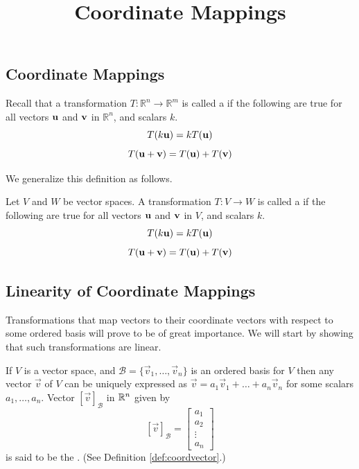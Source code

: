 \documentclass{ximera}
\title{Coordinate Mappings} \license{CC BY-NC-SA 4.0}
\begin{document}
\begin{abstract}
\end{abstract}
\maketitle

\begin{onlineOnly}
\section*{Coordinate Mappings}
\end{onlineOnly}

Recall that a transformation $T:\mathbb{R}^n\rightarrow \mathbb{R}^m$ is called a  if the following are true for all vectors ${\bf u}$ and ${\bf v}$ in $\mathbb{R}^n$, and scalars $k$.
\begin{equation*}
T(k{\bf u})= kT({\bf u})
\end{equation*}
\begin{equation*}
T({\bf u}+{\bf v})= T({\bf u})+T({\bf v})
\end{equation*}

We generalize this definition as follows.

\begin{definition}\label{def:lintransgeneral}
Let $V$ and $W$ be vector spaces. A transformation $T:V\rightarrow W$ is called a  if the following are true for all vectors ${\bf u}$ and ${\bf v}$ in $V$, and scalars $k$.
\begin{equation*}
T(k{\bf u})= kT({\bf u})
\end{equation*}
\begin{equation*}
T({\bf u}+{\bf v})= T({\bf u})+T({\bf v})
\end{equation*}
\end{definition}

\subsection*{Linearity of Coordinate Mappings}
Transformations that map vectors to their coordinate vectors with respect to some ordered basis will prove to be of great importance.  We will start by showing that such transformations are linear.

If $V$ is a vector space, and  $\mathcal{B}=\{\vec{v}_1, \ldots ,\vec{v}_n\}$ is an ordered basis for $V$ then any vector $\vec{v}$ of $V$ can be uniquely expressed as $\vec{v}=a_1\vec{v}_1+\ldots +a_n\vec{v}_n$ for some scalars $a_1, \ldots ,a_n$.  Vector $[\vec{v}]_{\mathcal{B}}$ in $\mathbb{R}^n$ given by 
$$[\vec{v}]_{\mathcal{B}}=\begin{bmatrix}a_1\\a_2\\\vdots\\a_n\end{bmatrix}$$
is said to be the .  (See Definition \ref{def:coordvector}.)  
\end{document}
